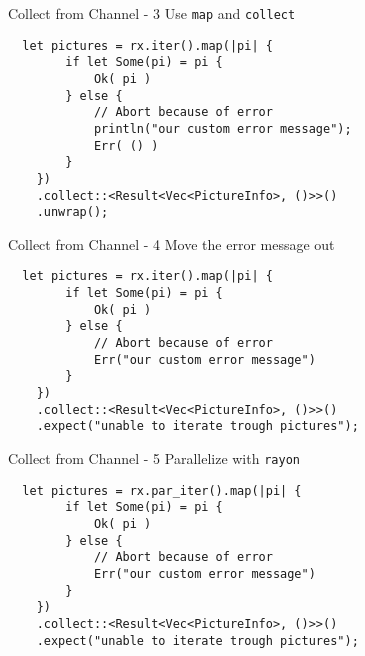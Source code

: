 \documentclass[aspectratio=1610,t]{beamer}
\begin{document}
\begin{frame}[fragile]{Collect from Channel - 3}
Use \texttt{map} and \texttt{collect}
\begin{verbatim}
  let pictures = rx.iter().map(|pi| {
        if let Some(pi) = pi {
            Ok( pi )
        } else {
            // Abort because of error
            println("our custom error message");
            Err( () )
        }
    })
    .collect::<Result<Vec<PictureInfo>, ()>>()
    .unwrap();
\end{verbatim}
\end{frame}

\begin{frame}[fragile]{Collect from Channel - 4}
Move the error message out
\begin{verbatim}
  let pictures = rx.iter().map(|pi| {
        if let Some(pi) = pi {
            Ok( pi )
        } else {
            // Abort because of error
            Err("our custom error message")
        }
    })
    .collect::<Result<Vec<PictureInfo>, ()>>()
    .expect("unable to iterate trough pictures");
\end{verbatim}
\end{frame}

\begin{frame}[fragile]{Collect from Channel - 5}
Parallelize with \texttt{rayon}
\begin{verbatim}
  let pictures = rx.par_iter().map(|pi| {
        if let Some(pi) = pi {
            Ok( pi )
        } else {
            // Abort because of error
            Err("our custom error message")
        }
    })
    .collect::<Result<Vec<PictureInfo>, ()>>()
    .expect("unable to iterate trough pictures");
\end{verbatim}
\end{frame}
\end{document}
